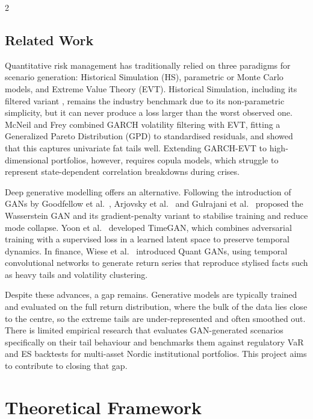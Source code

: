 \documentclass[12pt]{spieman}  %
\begin{document}
\begin{spacing}{2}
\subsection{Related Work}
\label{sect:related}

Quantitative risk management has traditionally relied on three paradigms for scenario generation: Historical Simulation (HS), parametric or Monte Carlo models, and Extreme Value Theory (EVT). Historical Simulation, including its filtered variant \cite{BaroneAdesi99}, remains the industry benchmark due to its non-parametric simplicity, but it can never produce a loss larger than the worst observed one. McNeil and Frey \cite{McNeilFrey00} combined GARCH volatility filtering with EVT, fitting a Generalized Pareto Distribution (GPD) to standardised residuals, and showed that this captures univariate fat tails well. Extending GARCH-EVT to high-dimensional portfolios, however, requires copula models, which struggle to represent state-dependent correlation breakdowns during crises.

Deep generative modelling offers an alternative. Following the introduction of GANs by Goodfellow et al.\ \cite{Goodfellow14}, Arjovsky et al.\ \cite{Arjovsky17} and Gulrajani et al.\ \cite{Gulrajani17} proposed the Wasserstein GAN and its gradient-penalty variant to stabilise training and reduce mode collapse. Yoon et al.\ \cite{Yoon19} developed TimeGAN, which combines adversarial training with a supervised loss in a learned latent space to preserve temporal dynamics. In finance, Wiese et al.\ \cite{Wiese20} introduced Quant GANs, using temporal convolutional networks to generate return series that reproduce stylised facts such as heavy tails and volatility clustering.

Despite these advances, a gap remains. Generative models are typically trained and evaluated on the full return distribution, where the bulk of the data lies close to the centre, so the extreme tails are under-represented and often smoothed out. There is limited empirical research that evaluates GAN-generated scenarios specifically on their tail behaviour and benchmarks them against regulatory VaR and ES backtests for multi-asset Nordic institutional portfolios. This project aims to contribute to closing that gap.

\section{Theoretical Framework}
\label{sect:theory}


\end{spacing}
\end{document}
